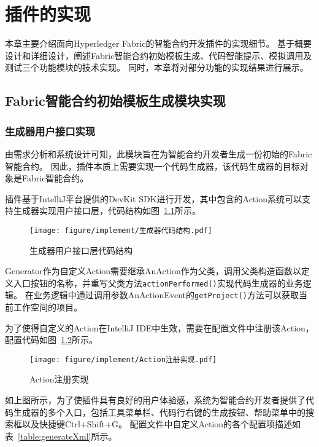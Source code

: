 \chapter{插件的实现}

本章主要介绍面向Hyperledger Fabric的智能合约开发插件的实现细节。
基于概要设计和详细设计，阐述Fabric智能合约初始模板生成、代码智能提示、模拟调用及测试三个功能模块的技术实现。
同时，本章将对部分功能的实现结果进行展示。

\section{Fabric智能合约初始模板生成模块实现}

\subsection{生成器用户接口实现}

由需求分析和系统设计可知，此模块旨在为智能合约开发者生成一份初始的Fabric智能合约。
因此，插件本质上需要实现一个代码生成器，该代码生成器的目标对象是Fabric智能合约。

插件基于IntelliJ平台提供的DevKit SDK进行开发，其中包含的Action系统可以支持生成器实现用户接口层，代码结构如图~\ref{fig:5.1}所示。

\begin{figure}[htb]
  \centering
  \texttt{[image: figure/implement/生成器代码结构.pdf]}
  \caption{生成器用户接口层代码结构}\label{fig:5.1}
\end{figure}

Generator作为自定义Action需要继承AnAction作为父类，调用父类构造函数以定义入口按钮的名称，并重写父类方法\texttt{actionPerformed()}实现代码生成器的业务逻辑。
在业务逻辑中通过调用参数AnActionEvent的\texttt{getProject()}方法可以获取当前工作空间的项目。

为了使得自定义的Action在IntelliJ IDE中生效，需要在配置文件中注册该Action，配置代码如图~\ref{fig:5.2}所示。

\begin{figure}[htb]
  \centering
  \texttt{[image: figure/implement/Action注册实现.pdf]}
  \caption{Action注册实现}\label{fig:5.2}
\end{figure}

如上图所示，为了使插件具有良好的用户体验感，系统为智能合约开发者提供了代码生成器的多个入口，包括工具菜单栏、代码行右键的生成按钮、帮助菜单中的搜索框以及快捷键Ctrl+Shift+G。
配置文件中自定义Action的各个配置项描述如表~\ref{table:generateXml}所示。

